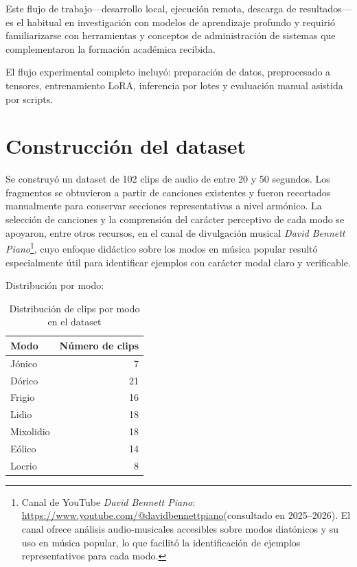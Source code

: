 \documentclass[%
    school=etsisi,%
    type=pfg,%
    degree=61CD,%
]{upm-report}
\begin{document}
Este flujo de trabajo---desarrollo local, ejecuci\'on remota, descarga de resultados---es el habitual en investigaci\'on con modelos de aprendizaje profundo y requiri\'o familiarizarse con herramientas y conceptos de administraci\'on de sistemas que complementaron la formaci\'on acad\'emica recibida.

El flujo experimental completo incluy\'o: preparaci\'on de datos, preprocesado a tensores, entrenamiento LoRA, inferencia por lotes y evaluaci\'on manual asistida por scripts.

\section{Construcci\'on del dataset}

Se construy\'o un dataset de 102 clips de audio de entre 20 y 50 segundos. Los fragmentos se obtuvieron a partir de canciones existentes y fueron recortados manualmente para conservar secciones representativas a nivel arm\'onico. La selecci\'on de canciones y la comprensi\'on del car\'acter perceptivo de cada modo se apoyaron, entre otros recursos, en el canal de divulgaci\'on musical \textit{David Bennett Piano}\footnote{Canal de YouTube \textit{David Bennett Piano}: \url{https://www.youtube.com/@davidbennettpiano}\linebreak (consultado en 2025--2026). El canal ofrece an\'alisis audio-musicales accesibles sobre modos diat\'onicos y su uso en m\'usica popular, lo que facilit\'o la identificaci\'on de ejemplos representativos para cada modo.}, cuyo enfoque did\'actico sobre los modos en m\'usica popular result\'o especialmente \'util para identificar ejemplos con car\'acter modal claro y verificable.

Distribuci\'on por modo:

\begin{table}[H]
    \centering
    \caption{Distribuci\'on de clips por modo en el dataset}
    \begin{tabular}{lr}
        \toprule
        \textbf{Modo} & \textbf{N\'umero de clips} \\
        \midrule
        J\'onico & 7 \\
        D\'orico & 21 \\
        Frigio & 16 \\
        Lidio & 18 \\
        Mixolidio & 18 \\
        E\'olico & 14 \\
        Locrio & 8 \\
        \bottomrule
    \end{tabular}
\end{table}
\end{document}
